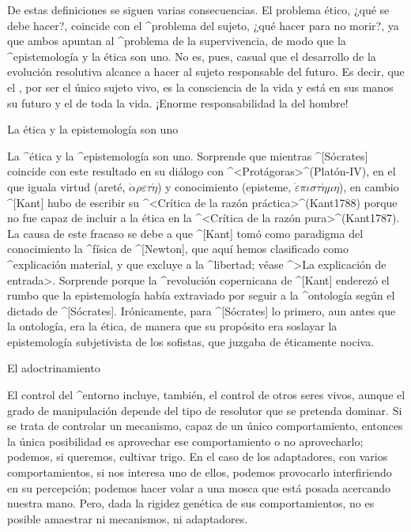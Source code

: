 De estas definiciones se siguen varias consecuencias. El problema ético,
¿qué se debe hacer?, coincide con el ^{problema del sujeto}, ¿qué hacer
para no morir?, ya que ambos apuntan al ^{problema de la supervivencia},
de modo que la ^{epistemología} y la ética son uno. No es, pues, casual
que el desarrollo de la evolución resolutiva alcance a hacer al sujeto
responsable del futuro. Es decir, que el , por ser
el único sujeto vivo, es la consciencia de la vida y está en sus manos
su futuro y el de toda la vida. ¡Enorme responsabilidad la del hombre!


\Section La ética y la epistemología son uno

La ^{ética} y la ^{epistemología} son uno. Sorprende que mientras
^[Sócrates] coincide con este resultado en su diálogo con
^<Protágoras>^(Platón-IV), en el que iguala
 virtud
  (areté, $\grave\alpha\rho\varepsilon\tau\acute\eta$) y
 conocimiento
  (episteme, $\grave\varepsilon\pi\iota\sigma\tau\acute\eta\mu\eta$),
en cambio ^[Kant] hubo de escribir su ^<Crítica de la razón
práctica>^(Kant1788) porque no fue capaz de incluir a la ética en la
^<Crítica de la razón pura>^(Kant1787). La causa de este fracaso se debe
a que ^[Kant] tomó como paradigma del conocimiento la ^{física} de
^[Newton], que aquí hemos clasificado como ^{explicación material}, y
que excluye a la ^{libertad}; véase ^>La explicación de entrada>.
Sorprende porque la ^{revolución copernicana} de ^[Kant] enderezó el
rumbo que la epistemología había extraviado por seguir a la ^{ontología}
según el dictado de ^[Sócrates]. Irónicamente, para ^[Sócrates] lo
primero, aun antes que la ontología, era la ética, de manera que su
propósito era soslayar la epistemología subjetivista de los sofistas,
que juzgaba de éticamente nociva.


\Section El adoctrinamiento

El control del ^{entorno} incluye, también, el control de otros seres
vivos, aunque el grado de manipulación depende del tipo de resolutor que
se pretenda dominar. Si se trata de controlar un mecanismo, capaz de un
único comportamiento, entonces la única posibilidad es aprovechar
ese comportamiento o no aprovecharlo; podemos, si queremos, cultivar
trigo. En el caso de los adaptadores, con varios comportamientos, si nos
interesa uno de ellos, podemos provocarlo interfiriendo en su
percepción; podemos hacer volar a una mosca que está posada acercando
nuestra mano. Pero, dada la rigidez genética de sus comportamientos, no
es posible amaestrar ni mecanismos, ni adaptadores.

